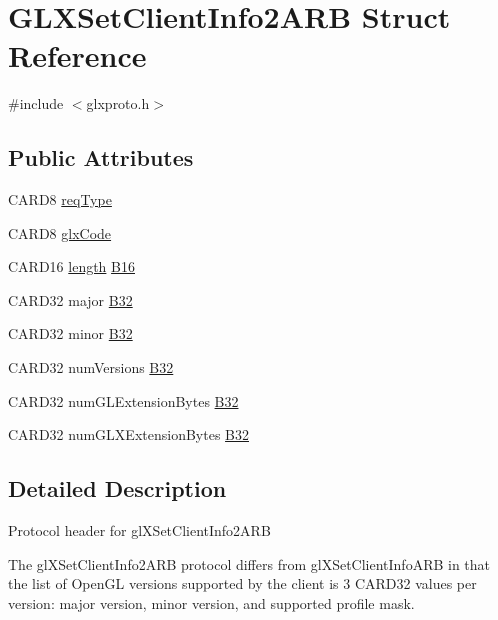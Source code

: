 \hypertarget{struct_g_l_x_set_client_info2_a_r_b}{}\section{G\+L\+X\+Set\+Client\+Info2\+A\+RB Struct Reference}
\label{struct_g_l_x_set_client_info2_a_r_b}


{\ttfamily \#include $<$glxproto.\+h$>$}

\subsection*{Public Attributes}
\begin{DoxyCompactItemize}
\item 
C\+A\+R\+D8 \hyperlink{struct_g_l_x_set_client_info2_a_r_b_a7dddef8f31e8dd54ff7b70c544d1db16}{req\+Type}
\item 
C\+A\+R\+D8 \hyperlink{struct_g_l_x_set_client_info2_a_r_b_a96b1d9376d8f8043edacad3ef2b4a4d1}{glx\+Code}
\item 
C\+A\+R\+D16 \hyperlink{glcorearb_8h_ab9c919755bde3b34349e23a32b4e0fa7}{length} \hyperlink{struct_g_l_x_set_client_info2_a_r_b_a71782e507762b16bafbd2f975e5570b5}{B16}
\item 
C\+A\+R\+D32 major \hyperlink{struct_g_l_x_set_client_info2_a_r_b_aa9ba69a16c48a7fdaa79dcee77ad877b}{B32}
\item 
C\+A\+R\+D32 minor \hyperlink{struct_g_l_x_set_client_info2_a_r_b_abd47525c84f5dde2bd08dc78ccaa9d26}{B32}
\item 
C\+A\+R\+D32 num\+Versions \hyperlink{struct_g_l_x_set_client_info2_a_r_b_a0023930414dbeae819e3ec5679056782}{B32}
\item 
C\+A\+R\+D32 num\+G\+L\+Extension\+Bytes \hyperlink{struct_g_l_x_set_client_info2_a_r_b_ac4545b6b5d0575174b66d3a654bfcbaf}{B32}
\item 
C\+A\+R\+D32 num\+G\+L\+X\+Extension\+Bytes \hyperlink{struct_g_l_x_set_client_info2_a_r_b_a672f820376ecc92bcb70ae0c26b2b80d}{B32}
\end{DoxyCompactItemize}


\subsection{Detailed Description}
Protocol header for gl\+X\+Set\+Client\+Info2\+A\+RB

The gl\+X\+Set\+Client\+Info2\+A\+RB protocol differs from gl\+X\+Set\+Client\+Info\+A\+RB in that the list of Open\+GL versions supported by the client is 3 {\ttfamily C\+A\+R\+D32} values per version\+: major version, minor version, and supported profile mask.

